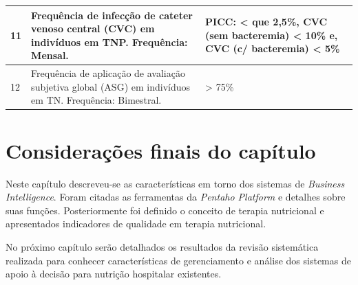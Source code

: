 \begin{quadro}[htb]
\begin{tabular}{|p{1cm}|p{9cm}|p{5cm}|}
    11 & Frequência de infecção de cateter venoso central (CVC) em indivíduos em
TNP. \newline Frequência: Mensal. & PICC: < que 2,5\%, CVC (sem bacteremia) < 10\% e, CVC (c/ bacteremia) < 5\% \\ \hline
    12 & Frequência de aplicação de avaliação subjetiva global (ASG) em indivíduos em
TN. \newline Frequência: Bimestral. & > 75\% \\ \hline
\end{tabular}
\end{quadro}

\section{Considerações finais do capítulo}
Neste capítulo descreveu-se as características em torno dos sistemas de \textit{Business Intelligence}. Foram citadas as ferramentas da \textit{Pentaho Platform} e detalhes sobre suas funções. Posteriormente foi definido o conceito de terapia nutricional e apresentados indicadores de qualidade em terapia nutricional.

No próximo capítulo serão detalhados os resultados da revisão sistemática realizada para conhecer características de gerenciamento e análise dos sistemas de apoio à decisão para nutrição hospitalar existentes.